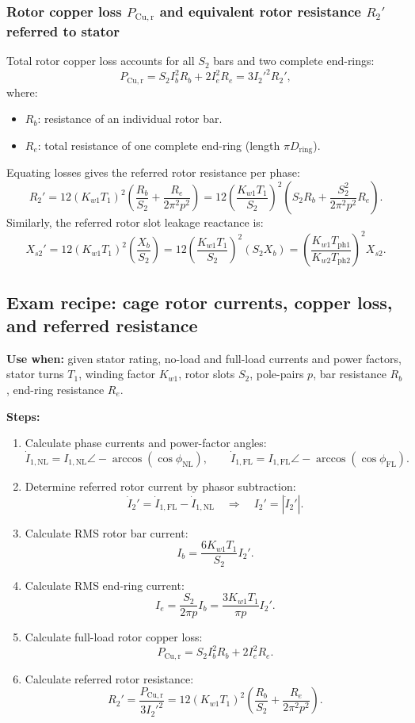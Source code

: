 \subsubsection{Rotor copper loss $P_{\mathrm{Cu,r}}$ and equivalent rotor resistance $R_2'$ referred to stator}
Total rotor copper loss accounts for all \(S_2\) bars and two complete end-rings:
\[
P_{\mathrm{Cu,r}} = S_2 I_b^2 R_b + 2 I_e^2 R_e = 3 {I_2'}^2 R_2',
\]
where:
\begin{itemize}
  \item \(R_b\): resistance of an individual rotor bar.
  \item \(R_e\): total resistance of one complete end-ring (length \(\pi D_{\mathrm{ring}}\)).
\end{itemize}
Equating losses gives the referred rotor resistance per phase:
\[
R_2' = 12 (K_{w1} T_1)^2 \left( \frac{R_b}{S_2} + \frac{R_e}{2\pi^2 p^2} \right)
= 12 \left(\frac{K_{w1} T_1}{S_2}\right)^2 \left( S_2 R_b + \frac{S_2^2}{2\pi^2 p^2} R_e \right).
\]
Similarly, the referred rotor slot leakage reactance is:
\[
X_{s2}' = 12 (K_{w1} T_1)^2 \left(\frac{X_b}{S_2}\right)
= 12 \left(\frac{K_{w1} T_1}{S_2}\right)^2 (S_2 X_b)
= \left(\frac{K_{w1} T_{\mathrm{ph1}}}{K_{w2} T_{\mathrm{ph2}}}\right)^2 X_{s2}.
\]

\subsection{Exam recipe: cage rotor currents, copper loss, and referred resistance}

\textbf{Use when:} given stator rating, no-load and full-load currents and power factors, stator turns \(T_1\), winding factor \(K_{w1}\), rotor slots \(S_2\), pole-pairs \(p\), bar resistance \(R_b\), end-ring resistance \(R_e\).

\textbf{Steps:}
\begin{enumerate}
  \item Calculate phase currents and power-factor angles:
  \[
  \dot{I}_{1,\mathrm{NL}} = I_{1,\mathrm{NL}} \angle -\arccos(\cos\phi_{\mathrm{NL}}),
  \qquad
  \dot{I}_{1,\mathrm{FL}} = I_{1,\mathrm{FL}} \angle -\arccos(\cos\phi_{\mathrm{FL}}).
  \]
  \item Determine referred rotor current by phasor subtraction:
  \[
  \dot{I}_2' = \dot{I}_{1,\mathrm{FL}} - \dot{I}_{1,\mathrm{NL}}
  \quad\Rightarrow\quad I_2' = |\dot{I}_2'|.
  \]
  \item Calculate RMS rotor bar current:
  \[
  I_b = \frac{6 K_{w1} T_1}{S_2} I_2'.
  \]
  \item Calculate RMS end-ring current:
  \[
  I_e = \frac{S_2}{2\pi p} I_b = \frac{3 K_{w1} T_1}{\pi p} I_2'.
  \]
  \item Calculate full-load rotor copper loss:
  \[
  P_{\mathrm{Cu,r}} = S_2 I_b^2 R_b + 2 I_e^2 R_e.
  \]
  \item Calculate referred rotor resistance:
  \[
  R_2' = \frac{P_{\mathrm{Cu,r}}}{3 {I_2'}^2} = 12 (K_{w1} T_1)^2 \left(\frac{R_b}{S_2} + \frac{R_e}{2\pi^2 p^2}\right).
  \]
\end{enumerate}

